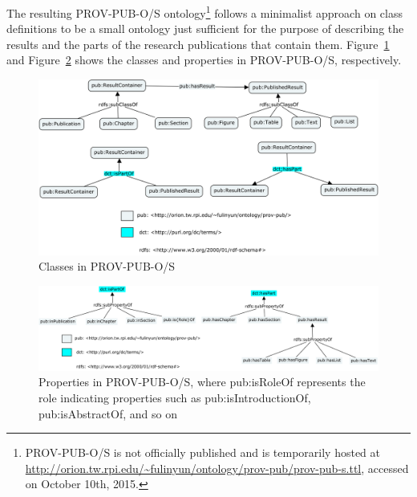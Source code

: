 The resulting PROV-PUB-O/S ontology\footnote{PROV-PUB-O/S is not officially published and is temporarily hosted at \url{http://orion.tw.rpi.edu/~fulinyun/ontology/prov-pub/prov-pub-s.ttl}, accessed on October 10th, 2015.} follows a minimalist approach on class definitions to be a small ontology just sufficient for the purpose of describing the results and the parts of the research publications that contain them. Figure~\ref{fig:prov-pub-s-classes} and Figure~\ref{fig:prov-pub-s-properties} shows the classes and properties in PROV-PUB-O/S, respectively.

\begin{figure}
	\centering
	\includegraphics[width=\textwidth]{model/ontology/prov-pub/prov-pub-s-classes.png}
	\caption{Classes in PROV-PUB-O/S}
	\label{fig:prov-pub-s-classes}
\end{figure}

\begin{figure}
	\centering
	\includegraphics[width=\textwidth]{model/ontology/prov-pub/prov-pub-s-properties.png}
	\caption[Properties in PROV-PUB-O/S]{Properties in PROV-PUB-O/S, where pub:is{Role}Of represents the role indicating properties such as pub:isIntroductionOf, pub:isAbstractOf, and so on}
	\label{fig:prov-pub-s-properties}
\end{figure}


